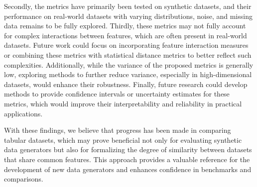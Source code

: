 Secondly, the metrics have primarily been tested on synthetic datasets, and their performance on real-world datasets with varying distributions, noise, and missing data remains to be fully explored. Thirdly, these metrics may not fully account for complex interactions between features, which are often present in real-world datasets. Future work could focus on incorporating feature interaction measures or combining these metrics with statistical distance metrics to better reflect such complexities. Additionally, while the variance of the proposed metrics is generally low, exploring methods to further reduce variance, especially in high-dimensional datasets, would enhance their robustness. Finally, future research could develop methods to provide confidence intervals or uncertainty estimates for these metrics, which would improve their interpretability and reliability in practical applications.


With these findings, we believe that progress has been made in comparing tabular datasets, which may prove beneficial not only for evaluating synthetic data generators but also for formalizing the degree of similarity between datasets that share common features. This approach provides a valuable reference for the development of new data generators and enhances confidence in benchmarks and comparisons.